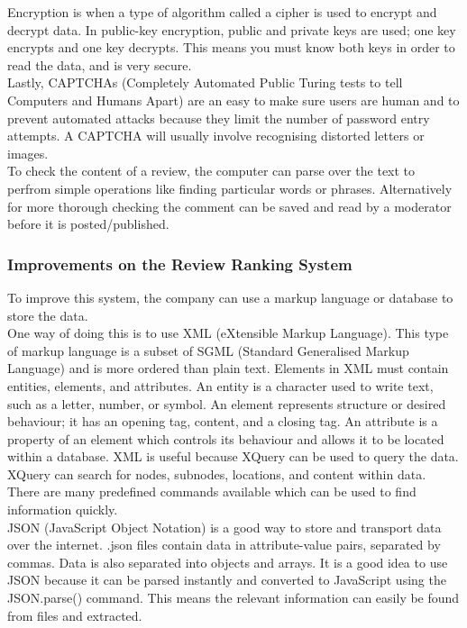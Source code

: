 \documentclass[12pt]{article}
\begin{document}
Encryption is when a type of algorithm called a cipher is used to encrypt and decrypt data. In public-key encryption, public and private keys are used; one key encrypts and one key decrypts. This means you must know both keys in order to read the data, and is very secure. \\

Lastly, CAPTCHAs (Completely Automated Public Turing tests to tell Computers and Humans Apart) are an easy to make sure users are human and to prevent automated attacks because they limit the number of password entry attempts. A CAPTCHA will usually involve recognising distorted letters or images.\\

To check the content of a review, the computer can parse over the text to perfrom simple operations like finding particular words or phrases. Alternatively for more thorough checking the comment can be saved and read by a moderator before it is posted/published.

\newpage
\subsubsection{Improvements on the Review Ranking System}

To improve this system, the company can use a markup language or database to store the data. \\

One way of doing this is to use XML (eXtensible Markup Language). This type of markup language is a subset of SGML (Standard Generalised Markup Language) and is more ordered than plain text. Elements in XML must contain entities, elements, and attributes. An entity is a character used to write text, such as a letter, number, or symbol. An element represents structure or desired behaviour; it has an opening tag, content, and a closing tag. An attribute is a property of an element which controls its behaviour and allows it to be located within a database. XML is useful because XQuery can be used to query the data. XQuery can search for nodes, subnodes, locations, and content within data. There are many predefined commands available which can be used to find information quickly. \\

JSON (JavaScript Object Notation) is a good way to store and transport data over the internet. .json files contain data in attribute-value pairs, separated by commas. Data is also separated into objects and arrays. It is a good idea to use JSON because it can be parsed instantly and converted to JavaScript using the JSON.parse() command. This means the relevant information can easily be found from files and extracted. \\
\end{document}
